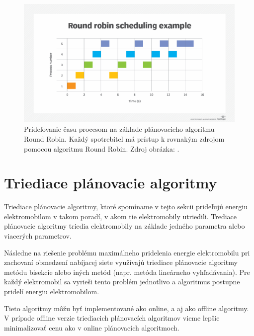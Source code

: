 \begin{figure}[H]
    \includegraphics[width=\textwidth]{images/round-robin-example.png}
    \centering
    \caption[Príklad plánovacie algoritmu Round Robin v praxi.]{Prideľovanie času procesom na základe plánovacieho algoritmu Round Robin. Každý spotrebiteľ má prístup k rovnakým zdrojom pomocou algoritmu Round Robin. Zdroj obrázka: \cite{websitecroundrobin2023}.}
    \label{architectureacnsim:obr2}
    \end{figure}



\section{Triediace plánovacie algoritmy}
Triediace plánovacie algoritmy, ktoré spomíname v tejto sekcii prideľujú energiu elektromobilom v takom poradí, v akom tie elektromobily utriedili. Trediace plánovacie algoritmy triedia elektromobily na základe jedného parametra alebo viacerých parametrov. 

Následne na riešenie problému maximálneho pridelenia energie elektromobilu pri zachovaní obmedzení nabíjacej siete využívajú triediace plánovacie algoritmy metódu bisekcie alebo iných metód (napr. metóda lineárneho vyhľadávania). Pre každý elektromobil sa vyrieši tento problém jednotlivo a algoritmus postupne pridelí energiu elektromobilom.


Tieto algoritmy môžu byť implementované ako online, a aj ako offline algoritmy. V prípade offline verzie triediacich plánovacích algoritmov vieme lepšie minimalizovať cenu ako v online plánovacích algoritmoch. \cite{chen2021smoothed}

